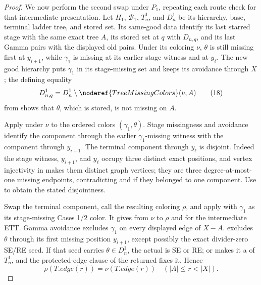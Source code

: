 \begin{proof}
We now perform the second swap under \(P_1\), repeating each route check
for that intermediate presentation.  Let \(H_1\), \(\mathcal B_1\),
\(T_n^1\), and \(D_n^1\) be its hierarchy, base, terminal ladder tree,
and stored set.  Its same-good data identify its last starred stage with
the same exact tree \(A\), its stored set at \(q\) with \(D_{n,q}\), and
its last Gamma pairs with the displayed old pairs.  Under its coloring
\(\nu\), \(\theta\) is still missing first at \(y_{i+1}\), while
\(\gamma_1\) is missing at its earlier stage witness and at \(y_\ell\).
The new good hierarchy puts \(\gamma_1\) in its stage-missing set and
keeps its avoidance through \(X\); the defining equality
\[
 D^1_{n,q}=D_n^1\setminus
       \noderef{TreeMissingColors}(\nu,A)                     \tag{18}
\]
from  shows that \(\theta\), which is
stored, is not missing on \(A\).

Apply  under \(\nu\) to the ordered colors
\((\gamma_1,\theta)\).  Stage missingness and avoidance identify the
component through the earlier \(\gamma_1\)-missing witness with the
component through \(y_{i+1}\).  The terminal component through
\(y_\ell\) is disjoint.  Indeed the stage witness, \(y_{i+1}\), and
\(y_\ell\) occupy three distinct exact positions, and vertex injectivity
in  makes them distinct graph vertices; they are
three degree-at-most-one missing endpoints, contradicting
 and
 if they belonged to one
component.  Use  to obtain the stated
disjointness.                                                        \(\tag{19}\)

Swap the terminal component, call the resulting coloring \(\rho\), and
apply  with \(\gamma_1\) as its
stage-missing Cases 1/2 color.  It gives
 from \(\nu\) to \(\rho\) and
 for the intermediate ETT.  Gamma avoidance excludes
\(\gamma_1\) on every displayed edge of \(X-A\).
 excludes \(\theta\) through
its first missing position \(y_{i+1}\), except possibly the exact
divider-zero SE/RE seed.  If that seed carries \(\theta\in D_n^1\), the
actual  is SE or RE;
 or
 makes it a
 of \(T_n^1\), and the protected-edge clause of
the returned  fixes it.  Hence
\[
 \rho(T.\mathit{edge}(r))=\nu(T.\mathit{edge}(r))
                       \quad(|A|\le r<|X|).                   \tag{20}
\]


\end{proof}
